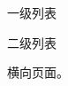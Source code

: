 \documentclass[fontset=fandol]{ctexbook}
\begin{document}
\begin{asparaenum}
  \item 一级列表
  \begin{inparaenum}
    \item 二级列表
  \end{inparaenum}
\end{asparaenum}

\begin{landscape}
横向页面。
\end{landscape}


\end{document}
